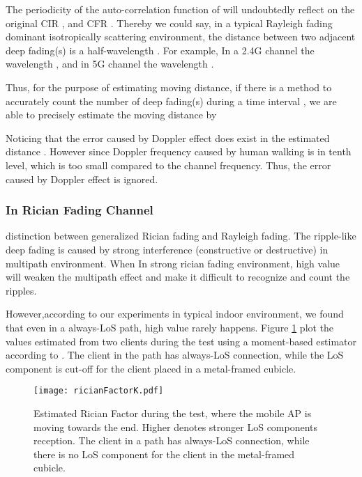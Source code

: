 The periodicity of the auto-correlation function of  will
undoubtedly reflect on the original CIR , and CFR
. Thereby we could say, in a typical Rayleigh fading dominant
isotropically scattering environment, the distance 
between two adjacent deep fading(s) is a half-wavelength .
For example, In a 2.4G channel the wavelength , and in 5G channel the wavelength .

Thus, for the purpose of estimating moving distance,
 if there is a method to accurately count the number of deep fading(s)
  during a time interval , we are able to precisely
 estimate the moving distance  by


Noticing that the error caused by Doppler effect does exist in the
estimated distance .
However since Doppler frequency caused by human
 walking  is in tenth level, which is too small compared to the
 channel frequency.
Thus, the error caused by Doppler effect is ignored.


\subsubsection{In Rician Fading Channel}
distinction between generalized Rician fading and Rayleigh fading.
The ripple-like deep fading is caused by strong interference
 (constructive or destructive) in multipath environment. When In strong rician
fading environment,
   high  value will
 weaken the multipath effect and make it difficult to recognize and
 count the ripples.

However,according to our experiments in typical indoor environment, we found
that even in a
 always-LoS path, high value  rarely happens.
Figure \ref{fig:ricianfactor} plot the   values estimated from two
clients during the test using a moment-based estimator according to
\cite{ricianKestimate}.
The client in the path has always-LoS connection,
 while the LoS component is cut-off for the client placed in
 a metal-framed cubicle.

\begin{figure}[t]
\begin{center}
\texttt{[image: ricianFactorK.pdf]}
\end{center}
\caption{Estimated Rician Factor  during the test, where the mobile
  AP is moving towards the end. Higher  denotes stronger LoS
  components reception. The client in a path has always-LoS connection,
  while there is no LoS component for the client in the metal-framed
  cubicle.}
\label{fig:ricianfactor}
\end{figure}

